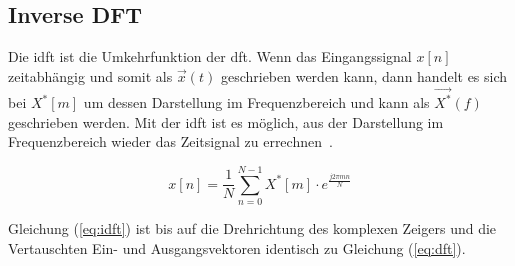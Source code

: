 \subsection{Inverse DFT}

Die \gls{idft} ist die Umkehrfunktion der \gls{dft}. Wenn das Eingangssignal $x[n]$ zeitabhängig und somit als $\vec{x}(t)$ geschrieben werden kann, dann handelt es sich bei $X^*[m]$ um
dessen Darstellung im Frequenzbereich und kann als $\vec{X^*}(f)$ geschrieben werden. Mit der \gls{idft} ist es möglich, aus der Darstellung im Frequenzbereich wieder das Zeitsignal zu errechnen~\autocite[552]{papula15mathematik}.

\begin{equation}\label{eq:idft}
 x \left[ n \right] = \frac{1}{N} \sum^{N-1}_{n=0} X^*[m] \cdot e^{\frac{j 2 \pi m n}{N}}
\end{equation}

Gleichung (\ref{eq:idft}) ist bis auf die Drehrichtung des komplexen Zeigers und die Vertauschten Ein- und Ausgangsvektoren identisch zu Gleichung (\ref{eq:dft}).
